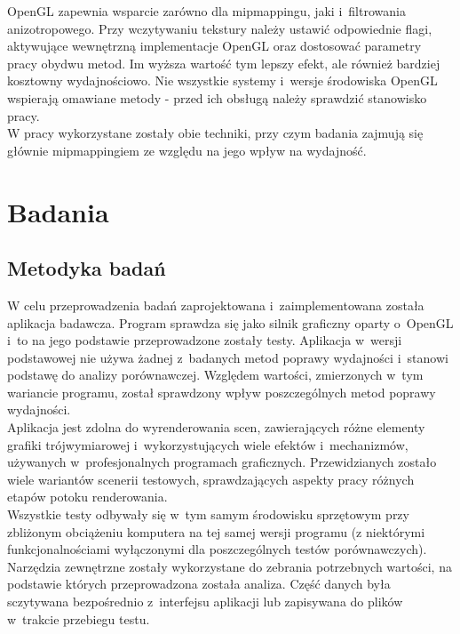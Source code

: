 \documentclass[a4paper,twoside,12pt]{book}
\begin{document}
OpenGL zapewnia wsparcie zarówno dla mipmappingu, jaki i~filtrowania anizotropowego. Przy wczytywaniu tekstury należy ustawić odpowiednie flagi, aktywujące wewnętrzną implementacje OpenGL oraz dostosować parametry pracy obydwu metod. Im wyższa wartość tym lepszy efekt, ale również bardziej kosztowny wydajnościowo. Nie wszystkie systemy i~wersje środowiska OpenGL wspierają omawiane metody - przed ich obsługą należy sprawdzić stanowisko pracy. \\

W pracy wykorzystane zostały obie techniki, przy czym badania zajmują się głównie mipmappingiem ze względu na jego wpływ na wydajność.


\chapter{Badania}

\section{Metodyka badań}
W celu przeprowadzenia badań zaprojektowana i~zaimplementowana została aplikacja badawcza. Program sprawdza się jako silnik graficzny oparty o~OpenGL i~to na jego podstawie przeprowadzone zostały testy. Aplikacja w~wersji podstawowej nie używa żadnej z~badanych metod poprawy wydajności i~stanowi podstawę do analizy porównawczej. Względem wartości, zmierzonych w~tym wariancie programu, został sprawdzony wpływ poszczególnych metod poprawy wydajności. \\
Aplikacja jest zdolna do wyrenderowania scen, zawierających różne elementy grafiki trójwymiarowej i~wykorzystujących wiele efektów i~mechanizmów, używanych w~profesjonalnych programach graficznych. Przewidzianych zostało wiele wariantów scenerii testowych, sprawdzających aspekty pracy różnych etapów potoku renderowania. \\
Wszystkie testy odbywały się w~tym samym środowisku sprzętowym przy zbliżonym obciążeniu komputera na tej samej wersji programu (z niektórymi funkcjonalnościami wyłączonymi dla poszczególnych testów porównawczych). \\
Narzędzia zewnętrzne zostały wykorzystane do zebrania potrzebnych wartości, na podstawie których przeprowadzona została analiza. Część danych była sczytywana bezpośrednio z~interfejsu aplikacji lub zapisywana do plików w~trakcie przebiegu testu. \\

\vbox{}
\end{document}
